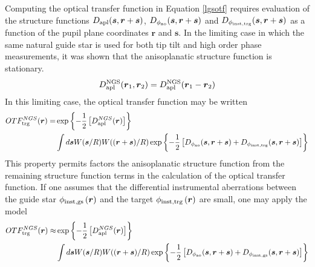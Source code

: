 Computing the optical transfer function in Equation \ref{lgsotf}
requires evaluation of the structure functions $D_{\rm
  apl}(\boldsymbol{s},\boldsymbol{r} + \boldsymbol{s})$, $D_{\rm
  \phi_{ao}}(\boldsymbol{s},\boldsymbol{r} + \boldsymbol{s})$ and
$D_{\rm \phi_{inst,trg}}(\boldsymbol{s},\boldsymbol{r} + \boldsymbol{s})$ as
a function of the pupil plane coordinates $\boldsymbol{r}$ and
$\boldsymbol{s}$.  In the limiting case in which the same natural
guide star is used for both tip tilt and high order phase
measurements, it was shown that the anisoplanatic structure function
is stationary\cite{2006PASP..118..885B}.
\begin{equation}
D^{\rm NGS}_{\rm apl}(\boldsymbol{r}_{1},\boldsymbol{r}_{2}) = 
D^{\rm NGS}_{\rm apl}(\boldsymbol{r}_{1} - \boldsymbol{r}_{2}) 
\end{equation}
In this limiting case, the optical transfer function may be written 
\begin{equation}\label{ngsotf}
\begin{aligned}
OTF^{NGS}_{\rm trg}(\boldsymbol{r}) = 
& \exp{\left\{-{1 \over 2}\left[D^{NGS}_{\rm apl}(\boldsymbol{r})\right]\right\}}  \\
& \int d\boldsymbol{s} W(\boldsymbol{s}/R)W((\boldsymbol{r}+\boldsymbol{s})/R) 
\exp{\left\{-{1 \over 2}\left[
D_{\rm \phi_{ao}}(\boldsymbol{s},\boldsymbol{r} + \boldsymbol{s}) + 
D_{\rm \phi_{inst,trg}}(\boldsymbol{s},\boldsymbol{r} + \boldsymbol{s})
\right]\right\}}
\end{aligned}
\end{equation}
This property permits factors the anisoplanatic structure function
from the remaining structure function terms in the calculation of the
optical transfer function.  If one assumes that the differential
instrumental aberrations between the guide star $\phi_{\rm inst,
  gs}\left(\boldsymbol{r}\right)$ and the target $\phi_{\rm
  inst,trg}\left(\boldsymbol{r}\right)$ are small, one may apply the
model
\begin{equation}\label{ngsapproxotf}
\begin{aligned}
OTF^{NGS}_{\rm trg}(\boldsymbol{r}) \approx
& \exp{\left\{-{1 \over 2}\left[D^{NGS}_{\rm apl}(\boldsymbol{r})\right]\right\}}  \\
& \int d\boldsymbol{s} W(\boldsymbol{s}/R)W((\boldsymbol{r}+\boldsymbol{s})/R) 
\exp{\left\{-{1 \over 2}\left[
D_{\rm \phi_{ao}}(\boldsymbol{s},\boldsymbol{r} + \boldsymbol{s}) + 
D_{\rm \phi_{inst,gs}}(\boldsymbol{s},\boldsymbol{r} + \boldsymbol{s})
\right]\right\}}
\end{aligned}
\end{equation}

